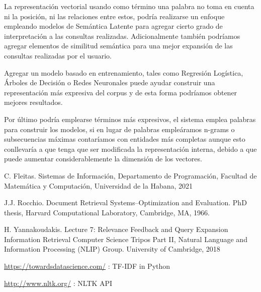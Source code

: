 \documentclass[runningheads,a4paper]{llncs}
\begin{document}
La representación vectorial usando como término una palabra no toma en cuenta ni la posición, ni las relaciones entre estos, podría realizarse un enfoque empleando modelos de Semántica Latente para agregar cierto grado de interpretación a las consultas realizadas. Adicionalmente también podríamos agregar elementos de 
similitud semántica para una mejor expansión de las consultas realizadas por el usuario.

Agregar un modelo basado en entrenamiento, tales como Regresión Logística, Árboles de Decisión o Redes Neuronales puede ayudar construir una representación más expresiva del corpus y de esta forma podríamos obtener mejores resultados. 

Por último podría emplearse términos más expresivos, el sistema emplea palabras para construir los modelos, si en lugar de palabras empleáramos n-grams o subsecuencias máximas contaríamos con entidades más completas aunque esto conllevaría a que tenga que ser modificada la representación interna, debido a que puede aumentar considerablemente la dimensión de los vectores.

\begin{thebibliography}{4}

 C. Fleitas. Sistemas de Información, Departamento de Programación, Facultad de Matemática y Computación, Universidad de la Habana, 2021

 J.J. Rocchio. Document Retrieval Systems–Optimization and Evaluation.
PhD thesis, Harvard Computational Laboratory, Cambridge, MA, 1966.

 H. Yannakoudakis. Lecture 7: Relevance Feedback and Query
Expansion Information Retrieval Computer Science Tripos Part II, Natural Language and Information Processing (NLIP) Group. University of Cambridge, 2018 

 \url{https://towardsdatascience.com/} : TF-IDF in Python

 \url{http://www.nltk.org/} : NLTK API

\end{thebibliography}
\end{document}
